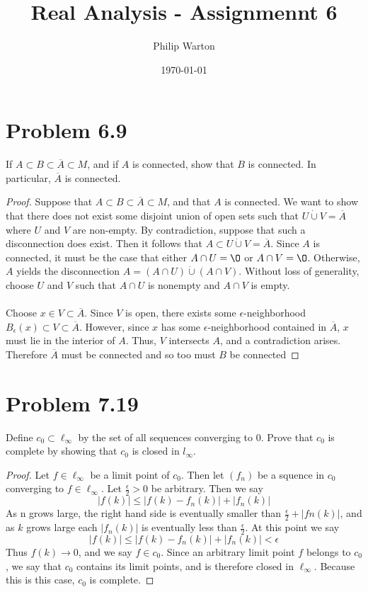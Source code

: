 \documentclass{article}
\theoremstyle{definition}
\begin{document}
\title{Real Analysis - Assignmennt 6}
\author{Philip Warton}
\date{\today}
\maketitle

    \section*{Problem 6.9}
        If $A \subset B \subset \overline{A} \subset M$, and if $A$ is connected, show that $B$ is connected. In particular, $\overline{A}$ is connected.
        \begin{proof}
            Suppose that $A \subset B \subset \overline{A} \subset M$, and that $A$ is connected. We want to show that there does not exist some disjoint union of open sets
            such that $U \dot \cup V = \overline{A}$ where $U$ and $V$ are non-empty. By contradiction, suppose that such a disconnection does exist. Then it follows that $A \subset U \dot \cup V = 
            \overline{A}$. Since $A$ is connected, it must be the case that either $A \cap U = \O$ or $A \cap V = \O$. Otherwise, $A$ yields the disconnection $A = (A \cap U) \dot \cup (A \cap V)$.
            Without loss of generality, choose $U$ and $V$ such that $A \cap U$ is nonempty and $A \cap V$ is empty.\\\\
            Choose $x \in V \subset \overline{A}$. Since $V$ is open, there exists some $\epsilon$-neighborhood $B_\epsilon(x) \subset V \subset \overline{A}$. However, since $x$ has some $\epsilon$-neighborhood
            contained in $\overline{A}$, $x$ must lie in the interior of $A$. Thus, $V$ intersects $A$, and a contradiction arises. Therefore $\overline{A}$ must be connected and so too must $B$ be connected
        \end{proof}

    \section*{Problem 7.19}
        Define $c_0 \subset \ell_\infty$ by the set of all sequences converging to 0.
        Prove that $c_0$ is complete by showing that $c_0$ is closed in $l_\infty$.
        \begin{proof}
            Let $f \in \ell_\infty$ be a limit point of $c_0$. Then let $(f_n)$ be a squence in $c_0$ converging to $f \in \ell_\infty$.
            Let $\frac{\epsilon}{2} > 0$ be arbitrary. Then we say 
            \[
                |f(k)| \leq |f(k) - f_n(k)| + |f_n(k)|
            \]
            As n grows large, the right hand side is eventually smaller than $\frac{\epsilon}{2} + |fn(k)|$, and as $k$ grows large each $|f_n(k)|$ is eventually less than $\frac{\epsilon}{2}$. At this point we say
            \[
                |f(k)| \leq |f(k) - f_n(k)| + |f_n(k)| < \epsilon
            \]
            Thus $f(k) \rightarrow 0$, and we say $f \in c_0$. Since an arbitrary limit point 
            $f$ belongs to $c_0$, we say that $c_0$ contains its limit points, and is therefore closed in $\ell_\infty$.
            Because this is this case, $c_0$ is complete.
        \end{proof}
\end{document}

